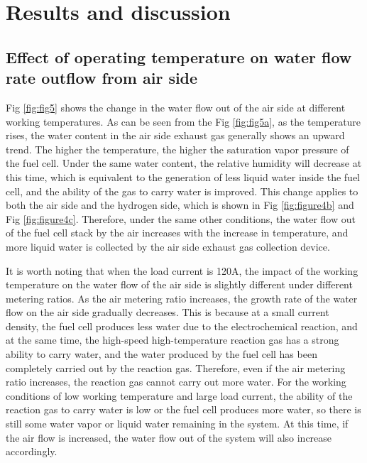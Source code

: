 \section{Results and discussion}
\subsection{Effect of operating temperature on water flow rate outflow from air side}

Fig \ref{fig:fig5} shows the change in the water flow out of the air side at different working temperatures. As can be seen from the Fig \ref{fig:fig5a}, as the temperature rises, the water content in the air side exhaust gas generally shows an upward trend. The higher the temperature, the higher the saturation vapor pressure of the fuel cell. Under the same water content, the relative humidity will decrease at this time, which is equivalent to the generation of less liquid water inside the fuel cell, and the ability of the gas to carry water is improved. This change applies to both the air side and the hydrogen side, which is shown in Fig \ref{fig:figure4b} and Fig \ref{fig:figure4c}. Therefore, under the same other conditions, the water flow out of the fuel cell stack by the air increases with the increase in temperature, and more liquid water is collected by the air side exhaust gas collection device.
\par
It is worth noting that when the load current is 120A, the impact of the working temperature on the water flow of the air side is slightly different under different metering ratios. As the air metering ratio increases, the growth rate of the water flow on the air side gradually decreases. This is because at a small current density, the fuel cell produces less water due to the electrochemical reaction, and at the same time, the high-speed high-temperature reaction gas has a strong ability to carry water, and the water produced by the fuel cell has been completely carried out by the reaction gas. Therefore, even if the air metering ratio increases, the reaction gas cannot carry out more water. For the working conditions of low working temperature and large load current, the ability of the reaction gas to carry water is low or the fuel cell produces more water, so there is still some water vapor or liquid water remaining in the system. At this time, if the air flow is increased, the water flow out of the system will also increase accordingly.
